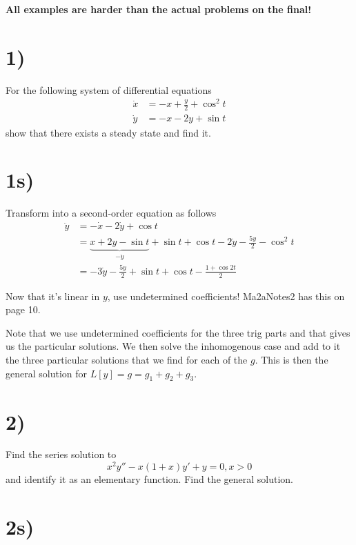\documentclass[10pt,twocolumn]{article}
\begin{document}
\pagestyle{fancy}

\begin{center}
    \textbf{All examples are harder than the actual problems on the final!}
\end{center}
\small

\section*{1)}

For the following system of differential equations
\begin{align*}
    \dot{x} &= -x + \frac{y}{2} + \cos^2 t\\
    \dot{y} &= -x - 2y + \sin t
\end{align*}
show that there exists a steady state and find it.

\section*{1s)}

Transform into a second-order equation as follows
\begin{align*}
    \ddot{y} &= -\dot{x} - 2\dot{y} + \cos t\\
    &= \underbrace{x + 2y - \sin t}_{-\dot{y}} + \sin t +\cos t - 2\dot{y} - \frac{5y}{2} - \cos^2 t \\
    &= -3\dot{y} - \frac{5y}{2} + \sin t +\cos t  - \frac{1+\cos 2t}{2}
\end{align*}

Now that it's linear in $y$, use undetermined coefficients! Ma2aNotes2 has this on page 10.

Note that we use undetermined coefficients for the three trig parts and that gives us the particular solutions. We then solve the inhomogenous case and add to it the three particular solutions that we find for each of the $g$. This is then the general solution for $L[y] = g = g_1 + g_2 + g_3$.

\section*{2)} 

Find the series solution to
$$x^2 y'' - x(1+x)y' + y = 0, x > 0$$
and identify it as an elementary function. Find the general solution.

\section*{2s)}
\end{document}
